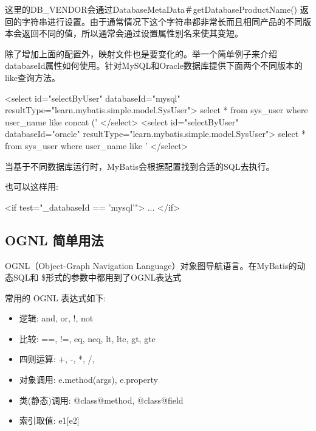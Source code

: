 这里的DB\_VENDOR会通过DatabaseMetaData＃getDatabaseProductName() 返回的字符串进行设置。由于通常情况下这个字符串都非常长而且相同产品的不同版本会返回不同的值，所以通常会通过设置属性别名来使其变短。

除了增加上面的配置外，映射文件也是要变化的。举一个简单例子来介绍databaseId属性如何使用。针对MySQL和Oracle数据库提供下面两个不同版本的like查询方法。

\begin{xml}
<select id="selectByUser" databaseId="mysql"
        resultType="learn.mybatis.simple.model.SysUser">
    select * from sys_user where user_name like concat ('%
</select>
<select id="selectByUser" databaseId="oracle"
        resultType="learn.mybatis.simple.model.SysUser">
    select * from sys_user
    where user_name like '%
</select>
\end{xml}

当基于不同数据库运行时，MyBatis会根据配置找到合适的SQL去执行。

也可以这样用:

\begin{xml}
<if test="_databaseId == 'mysql'">
...
</if>
\end{xml}

\subsection{OGNL 简单用法}

OGNL（Object-Graph Navigation Language）对象图导航语言。在MyBatis的动态SQL和 \${}形式的参数中都用到了OGNL表达式

常用的 OGNL 表达式如下:
\begin{itemize}
    \item 逻辑: and, or, !, not
    \item 比较: ==, !=, eq, neq, lt, lte, gt, gte
    \item 四则运算: +, -, *, /, %
    \item 对象调用: e.method(args), e.property
    \item 类(静态)调用: @class@method, @class@field
    \item 索引取值: e1[e2]
\end{itemize}

\newpage
